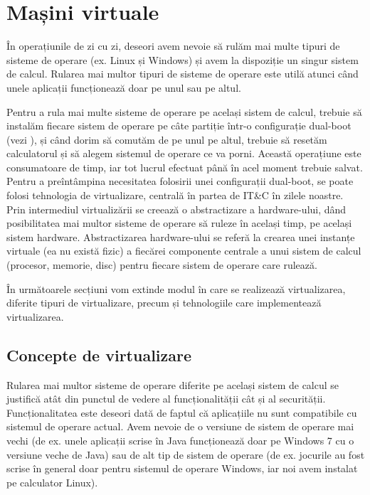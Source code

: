 \chapter{Mașini virtuale}
\label{chapter:vm}

În operațiunile de zi cu zi, deseori avem nevoie să rulăm mai multe tipuri de
sisteme de operare (ex. Linux și Windows) și avem la dispoziție un singur
sistem de calcul. Rularea mai multor tipuri de sisteme de operare este utilă
atunci când unele aplicații funcționează doar pe unul sau pe altul.

Pentru a rula mai multe sisteme de operare pe același sistem de calcul, trebuie
să instalăm fiecare sistem de operare pe câte partiție într-o configurație
dual-boot (vezi ), și când dorim să
comutăm de pe unul pe altul, trebuie să resetăm calculatorul și să alegem
sistemul de operare ce va porni. Această operațiune este consumatoare de timp,
iar tot lucrul efectuat până în acel moment trebuie salvat. Pentru a
preîntâmpina necesitatea folosirii unei configurații dual-boot, se poate folosi
tehnologia de virtualizare, centrală în partea de IT\&C în zilele noastre. Prin
intermediul virtualizării se creează o abstractizare a hardware-ului, dând
posibilitatea mai multor sisteme de operare să ruleze în același timp, pe
același sistem hardware. Abstractizarea hardware-ului se referă la crearea unei
instanțe virtuale (ea nu există fizic) a fiecărei componente centrale a unui
sistem de calcul (procesor, memorie, disc) pentru fiecare sistem de operare care
rulează.

În următoarele secțiuni vom extinde modul în care se realizează virtualizarea,
diferite tipuri de virtualizare, precum și tehnologiile care implementează
virtualizarea.

\section{Concepte de virtualizare}
\label{sec:vm:concepts}

Rularea mai multor sisteme de operare diferite pe același sistem de calcul se
justifică atât din punctul de vedere al funcționalității cât și al securității.
Funcționalitatea este deseori dată de faptul că aplicațiile nu sunt compatibile
cu sistemul de operare actual. Avem nevoie de o versiune de sistem de operare
mai vechi (de ex. unele aplicații scrise în Java funcționează doar pe Windows 7 cu
o versiune veche de Java) sau de alt tip de sistem de operare (de ex. jocurile au
fost scrise în general doar pentru sistemul de operare Windows, iar noi avem
instalat pe calculator Linux).

